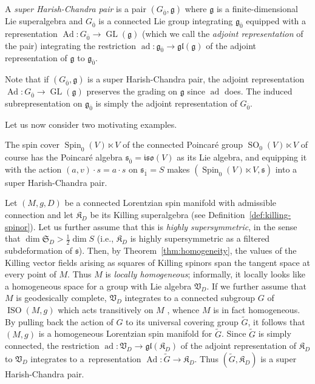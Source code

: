 \documentclass[10pt,a4paper]{amsart}
\numberwithin{equation}{section}
\newcommand{\fg}{\mathfrak{g}}
\newcommand{\fs}{\mathfrak{s}}
\newcommand{\fgl}{\mathfrak{gl}}
\newcommand{\fiso}{\mathfrak{iso}}
\newcommand{\fK}{\mathfrak{K}}
\newcommand{\fS}{\mathfrak{S}}
\newcommand{\fV}{\mathfrak{V}}
\newcommand{\1}{\mathbbm{1}}
\DeclareMathOperator{\GL}{GL}
\DeclareMathOperator{\Spin}{Spin}
\DeclareMathOperator{\SO}{SO}
\DeclareMathOperator{\ISO}{ISO}
\DeclareMathOperator{\Ad}{Ad}
\DeclareMathOperator{\ad}{ad}
\begin{document}
\begin{Definition}\label{def:super-Harish-Chandra}
	A \emph{super Harish-Chandra pair} is a pair $(G_{\overline0},\fg)$ where $\fg$ is a finite-dimensional Lie superalgebra and $G_{\overline0}$ is a connected Lie group integrating $\fg_{\overline0}$ equipped with a representation $\Ad\colon G_{\overline0}\to\GL(\fg)$ (which we call the \emph{adjoint representation} of the pair) integrating the restriction $\ad\colon\fg_{\overline0}\to\fgl(\fg)$ of the adjoint representation of $\fg$ to $\fg_{\overline0}$.
\end{Definition}

Note that if $(G_{\overline0},\fg)$ is a super Harish-Chandra pair, the adjoint representation $\Ad\colon G_{\overline0}\to\GL(\fg)$ preserves the grading on $\fg$ since $\ad$ does. The induced subrepresentation on $\fg_{\overline0}$ is simply the adjoint representation of $G_{\overline0}$.

Let us now consider two motivating examples.

\begin{Example}
The spin cover $\Spin_0(V)\ltimes V$ of the connected Poincar\'e group $\SO_0(V)\ltimes V$ of course has the Poincar\'e algebra $\fs_{\overline 0}=\fiso(V)$ as its Lie algebra, and equipping it with the action $(a,v)\cdot s = a\cdot s$ on $\fs_{\overline 1}=S$ makes $(\Spin_0(V)\ltimes V,\fs)$ into a super Harish-Chandra pair.
\end{Example}

\begin{Example}
Let $(M,g,D)$ be a connected Lorentzian spin manifold with admissible connection and let $\fK_D$ be its Killing superalgebra (see Definition~\ref{def:killing-spinor}). Let us further assume that this is \emph{highly supersymmetric}, in the sense that $\dim\fS_D>\frac{1}{2}\dim S$ (i.e., $\fK_D$ is highly supersymmetric as a filtered subdeformation of $\fs$). Then, by Theorem~\ref{thm:homogeneity}, the values of the Killing vector fields arising as squares of Killing spinors span the tangent space at every point of $M$. Thus $M$ is \emph{locally homogeneous}; informally, it locally looks like a homogeneous space for a group with Lie algebra $\fV_D$. If we further assume that $M$ is geodesically complete, $\fV_D$ integrates to a connected subgroup $G$ of $\ISO(M,g)$ which acts transitively on $M$ \cite[Theorem~2.2]{Stehney1980}, whence $M$ is in fact homogeneous. By pulling back the action of $G$ to its universal covering group $\widetilde{G}$, it follows that $(M,g)$ is a homogeneous Lorentzian spin manifold for $\widetilde{G}$. Since $\widetilde{G}$ is simply connected, the restriction $\ad\colon\fV_D\to\fgl(\fK_D)$ of the adjoint representation of $\fK_D$ to $\fV_D$ integrates to a~representation $\Ad\colon\widetilde{G}\to\fK_D$. Thus $(\widetilde{G},\fK_D)$ is a super Harish-Chandra pair.
\end{Example}
\end{document}
